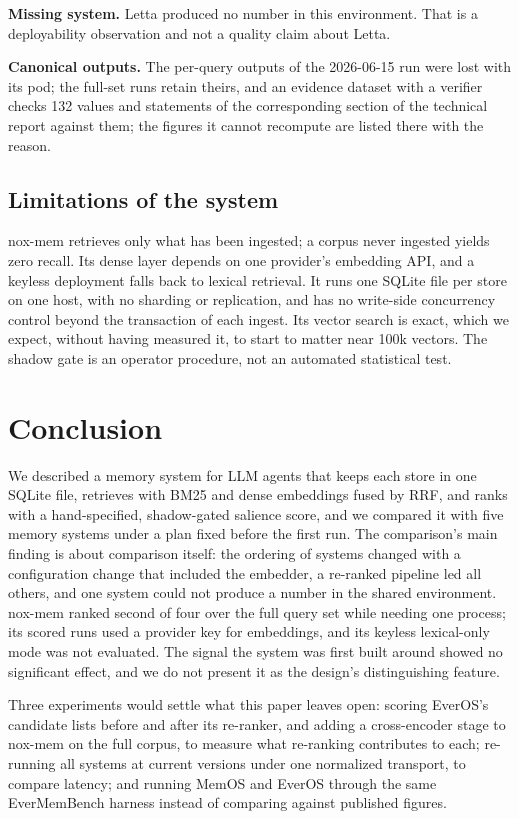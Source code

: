 \documentclass[a4paper,fleqn]{cas-sc}
\begin{document}
\textbf{Missing system.} Letta produced no number in this environment. That is a deployability observation and not a quality claim about Letta.

\textbf{Canonical outputs.} The per-query outputs of the 2026-06-15 run were lost with its pod; the full-set runs retain theirs, and an evidence dataset with a verifier checks 132 values and statements of the corresponding section of the technical report against them; the figures it cannot recompute are listed there with the reason.

\subsection{Limitations of the system}

nox-mem retrieves only what has been ingested; a corpus never ingested yields zero recall. Its dense layer depends on one provider's embedding API, and a keyless deployment falls back to lexical retrieval. It runs one SQLite file per store on one host, with no sharding or replication, and has no write-side concurrency control beyond the transaction of each ingest. Its vector search is exact, which we expect, without having measured it, to start to matter near 100k vectors. The shadow gate is an operator procedure, not an automated statistical test.

\section{Conclusion}

We described a memory system for LLM agents that keeps each store in one SQLite file, retrieves with BM25 and dense embeddings fused by RRF, and ranks with a hand-specified, shadow-gated salience score, and we compared it with five memory systems under a plan fixed before the first run. The comparison's main finding is about comparison itself: the ordering of systems changed with a configuration change that included the embedder, a re-ranked pipeline led all others, and one system could not produce a number in the shared environment. nox-mem ranked second of four over the full query set while needing one process; its scored runs used a provider key for embeddings, and its keyless lexical-only mode was not evaluated. The signal the system was first built around showed no significant effect, and we do not present it as the design's distinguishing feature.

Three experiments would settle what this paper leaves open: scoring EverOS's candidate lists before and after its re-ranker, and adding a cross-encoder stage to nox-mem on the full corpus, to measure what re-ranking contributes to each; re-running all systems at current versions under one normalized transport, to compare latency; and running MemOS and EverOS through the same EverMemBench harness instead of comparing against published figures.
\end{document}
